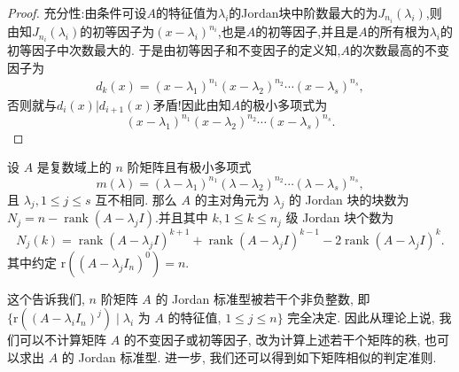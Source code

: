 \documentclass[../../main.tex]{subfiles}
\begin{document}
\begin{proof}
{\heiti 充分性:}由条件可设$A$的特征值为$\lambda_i$的Jordan块中阶数最大的为$J_{n_i}(\lambda_i)$,则由知$J_{n_i}(\lambda_i)$的初等因子为$(x-\lambda_i)^{n_i}$,也是$A$的初等因子,并且是$A$的所有根为$\lambda_i$的初等因子中次数最大的.
于是由初等因子和不变因子的定义知,$A$的次数最高的不变因子为
\begin{align*}
d_k(x)=(x-\lambda_1)^{n_1}(x-\lambda_2)^{n_2}\cdots(x-\lambda_s)^{n_s},
\end{align*}
否则就与$d_i(x)|d_{i+1}(x)$矛盾!因此由知$A$的极小多项式为
$$(x-\lambda_1)^{n_1}(x-\lambda_2)^{n_2}\cdots(x-\lambda_s)^{n_s}.$$

\end{proof}


\begin{theorem}[Jordan标准型的计算]\label{theorem:Jordan块的个数与秩的关系}
设 \( A \) 是复数域上的 \( n \) 阶矩阵且有极小多项式  
\[ m(\lambda) = (\lambda - \lambda_1)^{n_1} (\lambda - \lambda_2)^{n_2} \cdots (\lambda - \lambda_s)^{n_s}, \]  
且 \( \lambda_j, 1 \leqslant j \leqslant s \) 互不相同. 那么 \( A \) 的主对角元为 \( \lambda_j \) 的 Jordan 块的块数为 \( N_j = n - \operatorname{rank}(A - \lambda_j I) \).并且其中 \( k, 1 \leqslant k \leqslant n_j \) 级 Jordan 块个数为  
\[ N_j(k) = \operatorname{rank}(A - \lambda_j I)^{k+1} + \operatorname{rank}(A - \lambda_j I)^{k-1} - 2\operatorname{rank}(A - \lambda_j I)^k. \]
其中约定 $\mathrm{r}((A - \lambda_j I_n)^0) = n$.
\end{theorem}
\begin{remark}
这个告诉我们, $n$ 阶矩阵 $A$ 的 Jordan 标准型被若干个非负整数, 即 $\{\mathrm{r}((A - \lambda_i I_n)^j) \mid \lambda_i$ 为 $A$ 的特征值, $1 \leqslant  j \leqslant  n\}$ 完全决定. 因此从理论上说, 我们可以不计算矩阵 $A$ 的不变因子或初等因子, 改为计算上述若干个矩阵的秩, 也可以求出 $A$ 的 Jordan 标准型. 进一步, 我们还可以得到如下矩阵相似的判定准则.
\end{remark}
\end{document}
